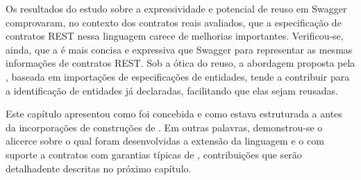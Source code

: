 Os resultados do estudo sobre a expressividade e potencial de reuso em Swagger
comprovaram, no contexto dos contratos reais avaliados, que a especificação de
contratos REST nessa linguagem carece de melhorias importantes. Verificou-se,
ainda, que a \neoidl{} é mais concisa e expressiva que Swagger para representar
as mesmas informações de contratos REST. Sob a ótica do reuso, a abordagem proposta pela
\neoidl{}, baseada em importações de especificações de entidades, tende a
contribuir para a identificação de entidades já declaradas, facilitando que
elas sejam reusadas.

Este capítulo apresentou como foi concebida e como estava estruturada a
\neoidl{} antes da incorporações de construções de \designbycontract{}. Em
outras palavras, demonstrou-se o alicerce sobre o qual foram
desenvolvidas a extensão da linguagem e o \framework{} \neoidl{} com suporte a
contratos com garantias típicas de \designbycontract{}, contribuições que serão
detalhadente descritas no próximo capítulo.
